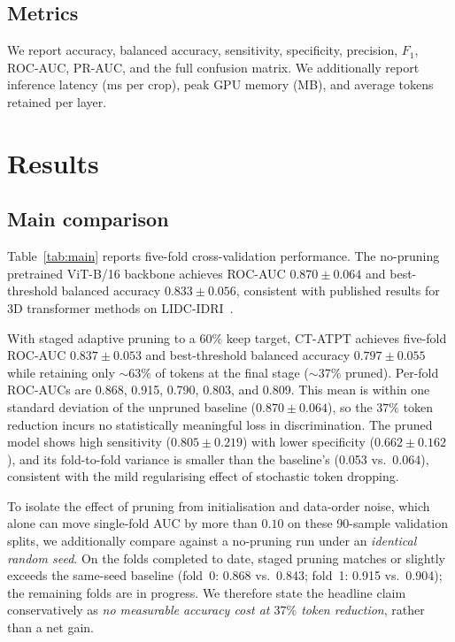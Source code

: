 \documentclass[journal]{IEEEtran}
\begin{document}
\subsection{Metrics}
We report accuracy, balanced accuracy, sensitivity, specificity, precision,
$F_1$, ROC-AUC, PR-AUC, and the full confusion matrix. We additionally
report inference latency (ms per crop), peak GPU memory (MB), and average
tokens retained per layer.

\section{Results}\label{sec:results}

\subsection{Main comparison}
Table~\ref{tab:main} reports five-fold cross-validation performance. The
no-pruning pretrained ViT-B/16 backbone achieves ROC-AUC
$0.870 \pm 0.064$ and best-threshold balanced accuracy
$0.833 \pm 0.056$, consistent with published results for 3D transformer
methods on LIDC-IDRI~\cite{hancock2016,xie2019}.

With staged adaptive pruning to a $60\%$ keep target, CT-ATPT achieves
five-fold ROC-AUC $0.837 \pm 0.053$ and best-threshold balanced accuracy
$0.797 \pm 0.055$ while retaining only $\sim$63\% of tokens at the final
stage ($\sim$37\% pruned). Per-fold ROC-AUCs are 0.868, 0.915, 0.790, 0.803,
and 0.809. This mean is within one standard deviation of the unpruned
baseline ($0.870 \pm 0.064$), so the $37\%$ token reduction incurs no
statistically meaningful loss in discrimination. The pruned model shows high
sensitivity ($0.805 \pm 0.219$) with lower specificity
($0.662 \pm 0.162$), and its fold-to-fold variance is smaller than the
baseline's (0.053 vs.\ 0.064), consistent with the mild regularising effect
of stochastic token dropping.

To isolate the effect of pruning from initialisation and data-order noise,
which alone can move single-fold AUC by more than $0.10$ on these
90-sample validation splits, we additionally compare against a no-pruning run
under an \emph{identical random seed}. On the folds completed to date, staged
pruning matches or slightly exceeds the same-seed baseline (fold~0: 0.868
vs.\ 0.843; fold~1: 0.915 vs.\ 0.904); the remaining folds are in progress.
We therefore state the headline claim conservatively as \emph{no measurable
accuracy cost at $37\%$ token reduction}, rather than a net gain.
\end{document}
